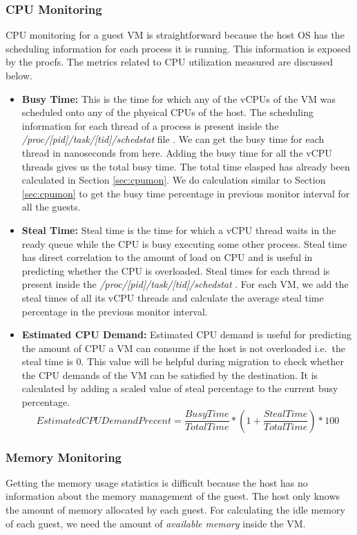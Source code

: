 \subsubsection{CPU Monitoring}
CPU monitoring for a guest VM is straightforward because the host OS has the scheduling information for each process it is running. This information is exposed by the procfs. The metrics related to CPU utilization measured are discussed below.
\begin{itemize}
\item \textbf{Busy Time:} This is the time for which any of the vCPUs of the VM was scheduled onto any of the physical CPUs of the host. The scheduling information for each thread of a process is present inside the \textit{/proc/[pid]/task/[tid]/schedstat} file \cite{procfs}. We can get the busy time for each thread in nanoseconds from here. Adding the busy time for all the vCPU threads gives us the total busy time. The total time elasped has already been calculated in Section \ref{sec:cpumon}. We do calculation similar to Section \ref{sec:cpumon} to get the busy time percentage in previous monitor interval for all the guests.
\item \textbf{Steal Time:} Steal time \cite{ehrhardt2013cpu} is the time for which a vCPU thread waits in the ready queue while the CPU is busy executing some other process. Steal time has direct correlation to the amount of load on CPU and is useful in predicting whether the CPU is overloaded. Steal times for each thread is present inside the \textit{/proc/[pid]/task/[tid]/schedstat} \cite{procfs}. For each VM, we add the steal times of all its vCPU threads and calculate the average steal time percentage in the previous monitor interval.
\item \textbf{Estimated CPU Demand:} Estimated CPU demand is useful for predicting the amount of CPU a VM can consume if the host is not overloaded i.e.\ the steal time is 0. This value will be helpful during migration to check whether the CPU demands of the VM can be satisfied by the destination. It is calculated by adding a scaled value of steal percentage to the current busy percentage.
$$Estimated CPU DemandPrecent = \frac{Busy Time}{Total Time}*(1+\frac{Steal Time}{Total Time})*100 $$
\end{itemize}
\subsubsection{Memory Monitoring}
Getting the memory usage statistics is difficult because the host has no information about the memory management of the guest. The host only knows the amount of memory allocated by each guest. For calculating the idle memory of each guest, we need the amount of \textit{available memory} inside the VM.

